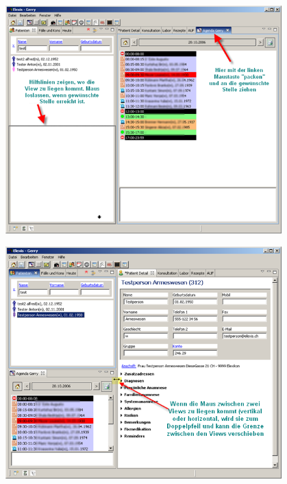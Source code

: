    \includegraphics[width=0.8\textwidth]{images/agendagewaehlt}
   
   \includegraphics[width=0.8\textwidth]{images/agendaanpassen}

